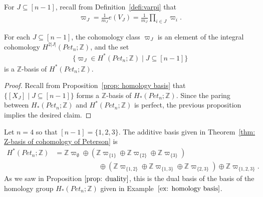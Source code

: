For $J\subseteq [n-1]$, recall from Definition~\ref{defi:varpi} that
\begin{align*}
\varpi_J 
= \frac{1}{m_J} e(V_J)
= \frac{1}{m_J} \prod_{i\in J}\varpi_i .
\end{align*} 

\begin{theorem}\label{thm: Z-basis of cohomology of Peterson}
For each $J\subseteq [n-1]$, the cohomology class $\varpi_J$ is an element of the integral cohomology $H^{2|J|}(Pet_{n};{\mathbb Z})$, and the set
\begin{align*}
\{ \varpi_J \in H^*(Pet_{n};{\mathbb Z}) \mid J\subseteq [n-1]\}
\end{align*}
is a ${\mathbb Z}$-basis of $H^*(Pet_{n};{\mathbb Z})$.
\end{theorem}

\begin{proof}
Recall from Proposition~\ref{prop: homology basis} that $\{[X_{J}] \mid J\subseteq[n-1]\}$ forms a ${\mathbb Z}$-basis of $H_*(Pet_{n};{\mathbb Z})$. Since the paring between $H_*(Pet_{n};{\mathbb Z})$ and $H^*(Pet_{n};{\mathbb Z})$ is perfect, the previous proposition implies the desired claim.
\end{proof}

\begin{exam}
{\rm 
Let $n=4$ so that $[n-1]=\{1,2,3\}$. The additive basis given in Theorem~\ref{thm: Z-basis of cohomology of Peterson} is
\begin{align*}
H^*(Pet_{n};{\mathbb Z}) &= {\mathbb Z}\varpi_{\emptyset}\oplus({\mathbb Z}\varpi_{\{1\}}\oplus{\mathbb Z}\varpi_{\{2\}}\oplus{\mathbb Z}\varpi_{\{3\}})\\
&\hspace{75pt}\oplus({\mathbb Z}\varpi_{\{1,2\}}\oplus{\mathbb Z}\varpi_{\{1,3\}}\oplus{\mathbb Z}\varpi_{\{2,3\}})\oplus{\mathbb Z}\varpi_{\{1,2,3\}}.
\end{align*}
As we saw in Proposition $\ref{prop: duality}$, this is the dual basis of the basis of the homology group $H_*(Pet_{n};{\mathbb Z})$ given in Example~$\ref{ex: homology basis}$.}
\end{exam}

